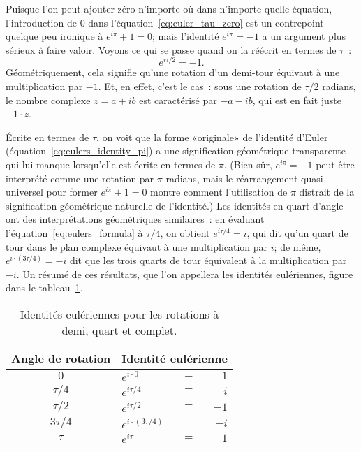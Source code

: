 Puisque l'on peut ajouter zéro n'importe où dans n'importe quelle équation,
l'introduction de $0$ dans l'équation~\eqref{eq:euler_tau_zero} est un
contrepoint quelque peu ironique à $e^{i\pi} + 1 = 0$\ns; mais l'identité
$e^{i\pi} = -1$ a un argument plus sérieux à faire valoir. Voyons ce qui
se passe quand on la réécrit en termes de $\tau$~:
\[
e^{i\tau /2} = -1.
\]
Géométriquement, cela signifie qu'une rotation d'un demi-tour équivaut à une
multiplication par $-1$. Et, en effet, c'est le cas~: sous une rotation de
$\tau/2$ radians, le nombre complexe $z = a + ib$ est caractérisé par $-a - ib$, qui
est en fait juste $-1\cdot z$.

Écrite en termes de $\tau$, on voit que la forme «\ns originale\ns » de l'identité
d'Euler (équation~\eqref{eq:eulers_identity_pi}) a une signification
géométrique transparente qui lui manque lorsqu'elle est écrite en termes de
$\pi$. (Bien sûr, $e^{i\pi} = -1$ peut être interprété comme une rotation par
$\pi$ radians, mais le réarrangement quasi universel pour former $e^{i\pi} + 1 =
0$ montre comment l'utilisation de $\pi$ distrait de la signification
géométrique naturelle de l'identité.) Les identités en quart d'angle ont des
interprétations géométriques similaires~: en évaluant
l'équation~\eqref{eq:eulers_formula} à $\tau/4$, on obtient $e^{i\tau/4} = i$,
qui dit qu'un quart de tour dans le plan complexe équivaut à une multiplication
par $i$\ns; de même, $e^{i\cdot(3\tau/4)} = -i$ dit que les trois quarts de tour
équivalent à la multiplication par $-i$. Un résumé de ces résultats, que l'on
appellera les identités eulériennes, figure dans le
tableau~\ref{table:eulerian_identities}.

\begin{table}
\begin{center}
\begin{tabular}{cllr}
Angle de rotation & \multicolumn{3}{c}{Identité eulérienne} \\ \hline
$0$ & $e^{i\cdot0}$ & $ = $ & $1$ \smallskip \\
$\tau/4$ & $e^{i\tau/4}$ & $ = $ & $i$ \smallskip \\
$\tau/2$ & $e^{i\tau/2}$ & $ = $ & $-1$ \smallskip \\
$3\tau/4$ & $e^{i\cdot(3\tau/4)}$ & $ = $ & $-i$ \smallskip \\
$\tau$ & $e^{i\tau}$ & $ = $ & $1$
\end{tabular}
\end{center}
\caption{Identités eulériennes pour les rotations à demi, quart et
complet.\label{table:eulerian_identities}}
\end{table}

